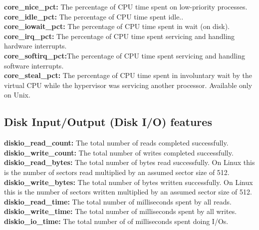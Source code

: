\documentclass{iosart2c}
\begin{document}
\textbf{core\_nice\_pct:} The percentage of CPU time spent on low-priority processes.\\

\textbf{core\_idle\_pct:} The percentage of CPU time spent idle..\\

\textbf{core\_iowait\_pct:} The percentage of CPU time spent in wait (on disk).\\

\textbf{core\_irq\_pct:} The percentage of CPU time spent servicing and handling hardware interrupts.\\

\textbf{core\_softirq\_pct:}The percentage of CPU time spent servicing and handling software interrupts.\\

\textbf{core\_steal\_pct:}  The percentage of CPU time spent in involuntary wait by the virtual CPU while the hypervisor was servicing another processor. Available only on Unix.


\subsection{Disk Input/Output (Disk I/O) features}

\textbf{diskio\_read\_count:} The total number of reads completed successfully.\\

\textbf{diskio\_write\_count:} The total number of writes completed successfully.\\

\textbf{diskio\_read\_bytes:} The total number of bytes read successfully. On Linux this is the number of sectors read multiplied by an assumed sector size of 512.\\

\textbf{diskio\_write\_bytes:} The total number of bytes written successfully. On Linux this is the number of sectors written multiplied by an assumed sector size of 512.\\

\textbf{diskio\_read\_time:} The total number of milliseconds spent by all reads.\\

\textbf{diskio\_write\_time:} The total number of milliseconds spent by all writes.\\

\textbf{diskio\_io\_time:} The total number of of milliseconds spent doing I/Os.\\
\end{document}
